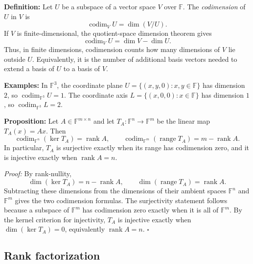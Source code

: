 \documentclass[a4paper,11pt,abstract=true]{scrartcl}
\theoremstyle{dotlessP}
\theoremstyle{dotlessS}
\theoremstyle{remark}
\theoremstyle{definition}
\begin{document}
\begin{definition_box}
\textbf{Definition:} Let $U$ be a subspace of a vector space $V$ over
$\mathbb{F}$. The \emph{codimension} of $U$ in $V$ is
\[
\operatorname{codim}_V U=\dim(V/U).
\]
If $V$ is finite-dimensional, the quotient-space dimension theorem gives
\[
\operatorname{codim}_V U=\dim V-\dim U.
\]
Thus, in finite dimensions, codimension counts how many dimensions of
$V$ lie outside $U$. Equivalently, it is the number of additional basis
vectors needed to extend a basis of $U$ to a basis of $V$.
\end{definition_box}

\begin{example_box}
\textbf{Examples:} In $\mathbb{F}^3$, the coordinate plane
$U=\{(x,y,0):x,y\in\mathbb{F}\}$ has dimension $2$, so
$\operatorname{codim}_{\mathbb{F}^3}U=1$. The coordinate axis
$L=\{(x,0,0):x\in\mathbb{F}\}$ has dimension $1$, so
$\operatorname{codim}_{\mathbb{F}^3}L=2$.
\end{example_box}

\begin{problem_box}
\textbf{Proposition:} Let $A\in\mathbb{F}^{m\times n}$ and let
$T_A:\mathbb{F}^n\longrightarrow\mathbb{F}^m$ be the linear map
$T_A(x)=Ax$. Then
\[
\operatorname{codim}_{\mathbb{F}^n}(\ker T_A)=\operatorname{rank}A,
\qquad
\operatorname{codim}_{\mathbb{F}^m}(\operatorname{range}T_A)
=m-\operatorname{rank}A.
\]
In particular, $T_A$ is surjective exactly when its range has
codimension zero, and it is injective exactly when
$\operatorname{rank}A=n$.
\end{problem_box}

\begin{claim_box}
\textit{Proof:} By rank-nullity,
\[
\dim(\ker T_A)=n-\operatorname{rank}A,
\qquad
\dim(\operatorname{range}T_A)=\operatorname{rank}A.
\]
Subtracting these dimensions from the dimensions of their ambient spaces
$\mathbb{F}^n$ and $\mathbb{F}^m$ gives the two codimension formulas.
The surjectivity statement follows because a subspace of $\mathbb{F}^m$
has codimension zero exactly when it is all of $\mathbb{F}^m$. By the
kernel criterion for injectivity, $T_A$ is injective exactly when
$\dim(\ker T_A)=0$, equivalently $\operatorname{rank}A=n$.
\hfill$\square$
\end{claim_box}

\subsection{Rank factorization}
\end{document}
